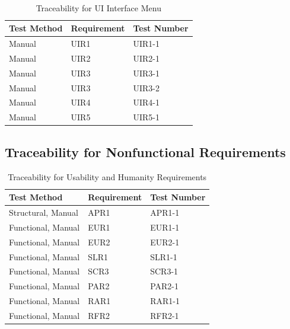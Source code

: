 \documentclass[12pt, titlepage]{article}
\begin{document}
\\
\begin{table}[H]
\begin{tabular}{|p{}|p{}|p{}|}

\hline Test Method&Requirement&Test Number\\

\hline Manual&UIR1&UIR1-1\\

\hline Manual&UIR2&UIR2-1\\

\hline Manual&UIR3&UIR3-1\\

\hline Manual&UIR3&UIR3-2\\

\hline Manual&UIR4&UIR4-1\\

\hline Manual&UIR5&UIR5-1\\

\hline

\end{tabular}
\caption{Traceability for UI Interface Menu}
\end{table}
\subsection{Traceability for Nonfunctional Requirements}

\begin{table}[H]
\begin{tabular}{|p{}|p{}|p{}|}

\hline Test Method&Requirement&Test Number\\

\hline Structural, Manual&APR1&APR1-1\\

\hline Functional, Manual&EUR1&EUR1-1\\

\hline Functional, Manual&EUR2&EUR2-1\\

\hline Functional, Manual&SLR1&SLR1-1\\

\hline Functional, Manual&SCR3&SCR3-1\\

\hline Functional, Manual&PAR2&PAR2-1\\

\hline Functional, Manual&RAR1&RAR1-1\\

\hline Functional, Manual&RFR2&RFR2-1\\

\hline

\end{tabular}
\caption{Traceability for Usability and Humanity Requirements}
\end{table}
\end{document}
